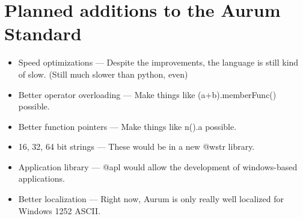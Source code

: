 \documentclass[12pt, letterpaper, oneside]{article}
\begin{document}
	\section{Planned additions to the Aurum Standard}
	\begin{itemize}
		\item[--] Speed optimizations --- Despite the improvements, the language is still kind of slow. (Still much slower than python, even)
		\item[--] Better operator overloading --- Make things like (a+b).memberFunc() possible.
		\item[--] Better function pointers --- Make things like n().a possible.
		\item[--] 16, 32, 64 bit strings --- These would be in a new @wstr library.
		\item[--] Application library --- @apl would allow the development of windows-based applications.
		\item[--] Better localization --- Right now, Aurum is only really well localized for Windows 1252 ASCII.
	\end{itemize}
	
	
	
	
	
	
	
\end{document}
